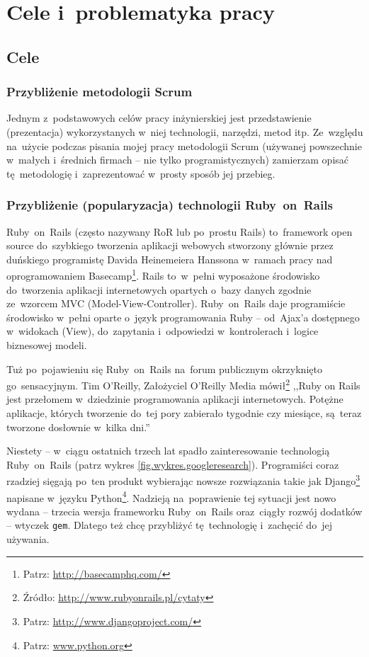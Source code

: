 \section{Cele i~problematyka pracy}

\subsection{Cele}

\subsubsection{Przybliżenie metodologii Scrum}

Jednym z~podstawowych celów pracy inżynierskiej jest przedstawienie (prezentacja) wykorzystanych w~niej technologii, narzędzi, metod itp. Ze~względu na~użycie podczas pisania mojej pracy metodologii Scrum \cite{scrumalliance} (używanej powszechnie w~małych i~średnich firmach -- nie tylko programistycznych) zamierzam opisać tę~metodologię i~zaprezentować w~prosty sposób jej przebieg.

\subsubsection{Przybliżenie (popularyzacja) technologii Ruby~on~Rails} \label{cele.ror}

Ruby~on~Rails (często nazywany RoR lub po~prostu Rails) to~framework open source do~szybkiego tworzenia aplikacji webowych stworzony głównie przez duńskiego programistę Davida Heinemeiera Hanssona w~ramach pracy nad oprogramowaniem Basecamp\footnote{Patrz: \url{http://basecamphq.com/}}. Rails to~w~pełni wyposażone środowisko do~tworzenia aplikacji internetowych opartych o~bazy danych zgodnie ze~wzorcem MVC (Model-View-Controller). Ruby~on~Rails daje programiście środowisko w~pełni oparte o~język programowania Ruby -- od~Ajax'a dostępnego w~widokach (View), do~zapytania i~odpowiedzi w~kontrolerach i~logice biznesowej modeli.


Tuż po~pojawieniu się Ruby~on~Rails na~forum publicznym okrzyknięto go~sensacyjnym. Tim O'Reilly, Założyciel O'Reilly Media mówił\footnote{Źródło: \url{http://www.rubyonrails.pl/cytaty}} ,,Ruby on Rails jest przełomem w~dziedzinie programowania aplikacji internetowych. Potężne aplikacje, których tworzenie do~tej pory zabierało tygodnie czy miesiące, są~teraz tworzone dosłownie w~kilka dni.''


Niestety -- w~ciągu ostatnich trzech lat spadło zainteresowanie technologią Ruby~on~Rails (patrz wykres \ref{fig.wykres.googleresearch}). Programiści coraz rzadziej sięgają po~ten produkt wybierając nowsze rozwiązania takie jak Django\footnote{Patrz: \url{http://www.djangoproject.com/}} napisane w~języku Python\footnote{Patrz: \url{www.python.org}}. Nadzieją na~poprawienie tej sytuacji jest nowo wydana -- trzecia wersja frameworku Ruby~on~Rails oraz~ciągły rozwój dodatków -- wtyczek \texttt{gem}. Dlatego też chcę przybliżyć tę~technologię i~zachęcić do~jej używania.


